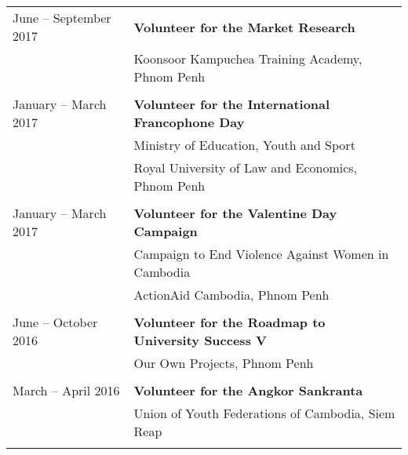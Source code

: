 \documentclass[10pt,a4paper]{article}
\begin{document}
\begin{longtable}[l]{@{} l l}
			\hspace{1em} June -- September 2017 & \textbf{Volunteer for the Market Research} \\
			& Koonsoor Kampuchea Training Academy, Phnom Penh \\
			& \vspace{-1em} \\
			
			\hspace{1em} January -- March 2017 & \textbf{Volunteer for the International Francophone Day} \\
			& Ministry of Education, Youth and Sport\\		& Royal University of Law and Economics, Phnom Penh \\
			& \vspace{-1em} \\
			
			\hspace{1em} January -- March 2017 & \textbf{Volunteer for the Valentine Day Campaign} \\		
			& Campaign to End Violence Against Women in Cambodia \\
			& ActionAid Cambodia, Phnom Penh \\	
			& \vspace{-1em} \\
			
			\hspace{1em} June -- October 2016 & \textbf{Volunteer for the Roadmap to University Success V} \\	
			& Our Own Projects, Phnom Penh \\
			& \vspace{-1em} \\
			
			\hspace{1em} March -- April 2016 & \textbf{Volunteer for the Angkor Sankranta} \\
			& Union of Youth Federations of Cambodia, Siem Reap \\		
			& \vspace{-1em} \\
			
		\end{longtable}
		
		
\end{document}

